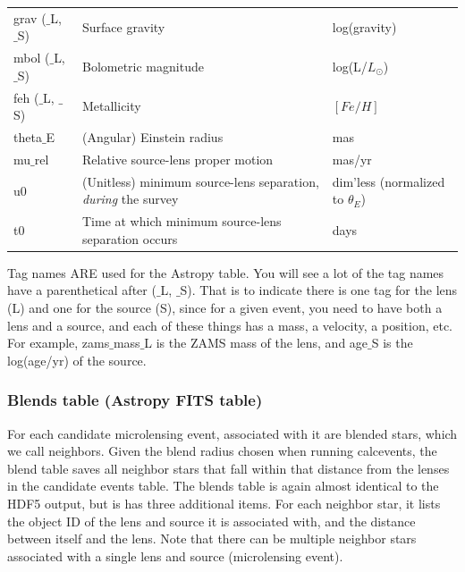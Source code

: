 \documentclass{scrartcl}
\def\tus{\textunderscore}
\begin{document}
\begin{table}[h]
\begin{tabular}{ l | p{6.5cm} | p{3cm} }
    grav ($\_$L, $\_$S) & Surface gravity & log(gravity) \\
    mbol ($\_$L, $\_$S) & Bolometric magnitude & log(L/$L_\odot$) \\
    feh ($\_$L, $\_$S) & Metallicity &  $[Fe/H]$\\
    theta$\_$E & (Angular) Einstein radius & mas \\
    mu$\_$rel & Relative source-lens proper motion & mas/yr \\
    u0 & (Unitless) minimum source-lens separation, \emph{during} the survey & dim'less (normalized to $\theta_E$) \\
    t0 & Time at which minimum source-lens separation occurs & days
\end{tabular}
\end{table}
Tag names ARE used for the Astropy table. You will see a lot of the tag names have a parenthetical after ($\_$L, $\_$S). That is to indicate there is one tag for the lens (L) and one for the source (S), since for a given event, you need to have both a lens and a source, and each of these things has a mass, a velocity, a position, etc. For example, zams$\_$mass$\_$L is the ZAMS mass of the lens, and age$\_$S is the log(age/yr) of the source. 

\subsubsection{Blends table (Astropy FITS table)}

For each candidate microlensing event, associated with it are blended stars, which we call neighbors.
Given the blend radius chosen when running calc\tus events, the blend table saves all neighbor stars that fall within that distance from the lenses in the candidate events table.
The blends table is again almost identical to the HDF5 output, but is has three additional items.
For each neighbor star, it lists the object ID of the lens and source it is associated with, and the distance between itself and the lens.
Note that there can be multiple neighbor stars associated with a single lens and source (microlensing event).
\end{document}
